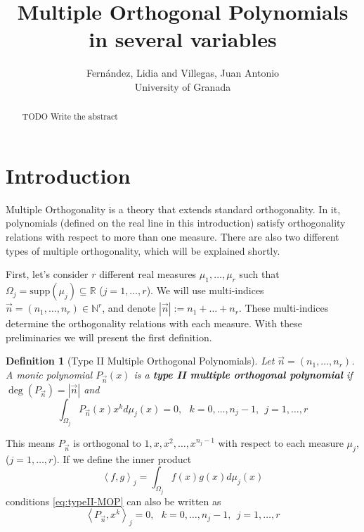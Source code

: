 \documentclass[12pt,a4]{report}
\theoremstyle{plain}
\newtheorem{definition}[theorem]{Definition}
\newcommand{\R}[0]{\mathbb{R}}
\newcommand{\N}[0]{\mathbb{N}}
\newcommand{\supp}[0]{\mathrm{supp}}
\newcommand{\cred}[1]{{\color{red} #1}}
\newcommand{\prodesc}[2]{\left\langle #1 , #2 \right\rangle}
\begin{document}
\title{Multiple Orthogonal Polynomials in several variables}


\author{Fernández, Lidia and Villegas, Juan Antonio\\
\small University of Granada}
\maketitle

\begin{abstract}
\cred{TODO Write the abstract}
\end{abstract}

\section*{Introduction}

Multiple Orthogonality is a theory that extends standard orthogonality. In it, polynomials (defined on the real line in this introduction) satisfy orthogonality relations with respect to more than one measure. There are also two different types of multiple orthogonality, which will be explained shortly.

First, let's consider $r$ different real measures $\mu_1,\dots,\mu_r$ such that $\Omega_j=\supp(\mu_j)\subseteq\R$ ($j=1,\dots,r$). We will use multi-indices $\vec n = (n_1, \dots,n_r)\in \N^r$, and denote $|\vec n| := n_1 + \dots + n_r$. These multi-indices determine the orthogonality relations with each measure. With these preliminaries we will present the first definition.

\begin{definition}[Type II Multiple Orthogonal Polynomials]
    Let $\vec n = (n_1,\dots,n_r)$. A monic polynomial $P_{\vec n}(x)$ is a \textbf{type II multiple orthogonal polynomial} if $\deg(P_{\vec n})= |\vec n|$ and 
    \begin{equation}
        \label{eq:typeII-MOP}
        \int_{\Omega_j} P_{\vec n}(x) x^k d\mu_j(x) = 0, \ \ \ k=0,\dots,n_{j}-1, \ \ j = 1,\dots,r
    \end{equation}
\end{definition}

This means $P_{\vec n}$ is orthogonal to $1,x,x^2,\dots,x^{n_j-1}$ with respect to each measure $\mu_j$, ($j=1,\dots,r$). If we define the inner product 
\begin{equation}
    \label{eq:inner-product}
    \prodesc{f}{g}_j=\int_{\Omega_j}f(x)g(x)d\mu_j(x)
\end{equation}
conditions \eqref{eq:typeII-MOP} can also be written as
\begin{equation}
    \label{eq:typeII-MOP-dot}
    \prodesc{P_{\vec n}}{x^k}_j = 0, \ \ \ k=0,\dots,n_{j}-1, \ \ j = 1,\dots,r
\end{equation}
\end{document}
